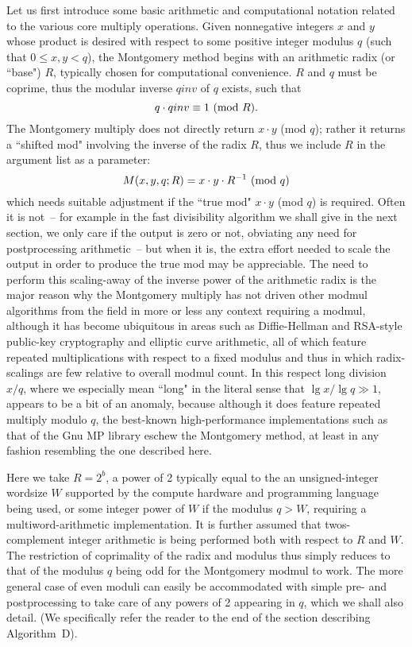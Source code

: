 \documentclass{article}
\begin{document}
Let us first introduce some basic arithmetic and computational notation related to the various core multiply operations. Given nonnegative integers $x$ and $y$ whose product is desired with respect to some positive integer modulus $q$ (such that $0 \le x,y < q$), the Montgomery method begins with an arithmetic radix (or ``base") $R$, typically chosen for computational convenience. $R$ and $q$ must be coprime, thus the modular inverse $qinv$ of $q$ exists, such that
\begin{equation}
	q \cdot qinv \equiv 1\ ({\rm mod}\ R).
\end{equation}
The Montgomery multiply does not directly return $x \cdot y$ (mod $q$); rather it returns a ``shifted mod" involving the inverse of the radix $R$, thus we include $R$ in the argument list as a parameter:
\begin{equation}
	M(x,y,q;R) = x \cdot y \cdot R^{-1}\ ({\rm mod}\ q)
\end{equation}
which needs suitable adjustment if the ``true mod" $x \cdot y$ (mod $q$) is required. Often it is not~-- for example in the fast divisibility algorithm we shall give in the next section, we only care if the output is zero or not, obviating any need for postprocessing arithmetic~-- but when it is, the extra effort needed to scale the output in order to produce the true mod may be appreciable. The need to perform this scaling-away of the inverse power of the arithmetic radix is the major reason why the Montgomery multiply has not driven other modmul algorithms from the field in more or less any context requiring a modmul, although it has become ubiquitous in areas such as Diffie-Hellman and RSA-style public-key cryptography and elliptic curve arithmetic, all of which feature repeated multiplications with respect to a fixed modulus and thus in which radix-scalings are few relative to overall modmul count. In this respect long division $x/q$, where we especially mean ``long" in the literal sense that $\lg x/\lg q \gg 1$, appears to be a bit of an anomaly, because although it does feature repeated multiply modulo $q$, the best-known high-performance implementations such as that of the Gnu MP library \cite{GMP} eschew the Montgomery method, at least in any fashion resembling the one described here.

Here we take $R = 2^b$, a power of 2 typically equal to the an unsigned-integer wordsize $W$ supported by the compute hardware and programming language being used, or some integer power of $W$ if the modulus $q > W$, requiring a multiword-arithmetic implementation. It is further assumed that twos-complement integer arithmetic is being performed both with respect to $R$ and $W$. The restriction of coprimality of the radix and modulus thus simply reduces to that of the modulus $q$ being odd for the Montgomery modmul to work. The more general case of even moduli can easily be accommodated with simple pre- and postprocessing to take care of any powers of 2 appearing in $q$, which we shall also detail. (We specifically refer the reader to the end of the section describing Algorithm~D).
\end{document}
